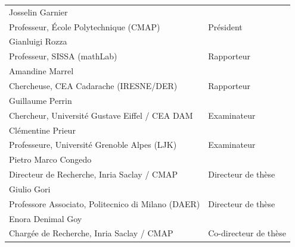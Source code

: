 \documentclass[a4paper]{article}
\newcommand{\jurynameA}{Josselin Garnier}
\newcommand{\juryadressA}{Professeur, École Polytechnique (CMAP)}
\newcommand{\juryroleA}{Président}
\newcommand{\jurynameB}{Gianluigi Rozza}
\newcommand{\juryadressB}{Professeur, SISSA (mathLab)}
\newcommand{\juryroleB}{Rapporteur}
\newcommand{\jurynameC}{Amandine Marrel}
\newcommand{\juryadressC}{Chercheuse, CEA Cadarache (IRESNE/DER)}
\newcommand{\juryroleC}{Rapporteur}
\newcommand{\jurynameD}{Guillaume Perrin}
\newcommand{\juryadressD}{Chercheur, Université Gustave Eiffel / CEA DAM}
\newcommand{\juryroleD}{Examinateur}
\newcommand{\jurynameE}{Clémentine Prieur}
\newcommand{\juryadressE}{Professeure, Université Grenoble Alpes (LJK)}
\newcommand{\juryroleE}{Examinateur}
\newcommand{\jurynameF}{Pietro Marco Congedo}
\newcommand{\juryadressF}{Directeur de Recherche, Inria Saclay / CMAP}
\newcommand{\juryroleF}{Directeur de thèse}
\newcommand{\jurynameG}{Giulio Gori}
\newcommand{\juryadressG}{Professore Associato, Politecnico di Milano (DAER)}
\newcommand{\juryroleG}{Directeur de thèse}
\newcommand{\jurynameH}{Enora Denimal Goy}
\newcommand{\juryadressH}{Chargée de Recherche, Inria Saclay / CMAP}
\newcommand{\juryroleH}{Co-directeur de thèse}
\begin{document}
\begin{textblock}{10}
	\label{jury} 																				%
	\begin{flushleft}
	\begin{tabular}{@{} L{9.64cm} R{4.5cm}}
		\jurynameA  \\ \juryadressA & \juryroleA \\[5pt]
		\jurynameB  \\ \juryadressB & \juryroleB \\[5pt]
		\jurynameC  \\ \juryadressC & \juryroleC \\[5pt]
		\jurynameD  \\ \juryadressD & \juryroleD \\[5pt]
		\jurynameE  \\ \juryadressE & \juryroleE \\[5pt]
		\jurynameF  \\ \juryadressF & \juryroleF \\[5pt]
		\jurynameG  \\ \juryadressG & \juryroleG \\[5pt]
		\jurynameH  \\ \juryadressH & \juryroleH \\[5pt]
	\end{tabular} 
	\end{flushleft}   
\end{textblock}
\end{document}
